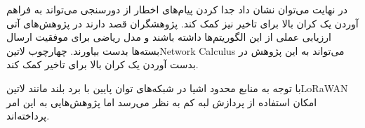 در نهایت می‌توان نشان داد جدا کردن پیام‌های اخطار از دورسنجی می‌تواند به فراهم آوردن یک کران بالا برای تاخیر نیز کمک کند. پژوهشگران قصد دارند در پژوهش‌های آتی ارزیابی عملی از این الگوریتم‌ها داشته باشند
و مدل ریاضی برای موفقیت ارسال بسته‌ها بدست بیاورند. چهارچوب ‌لاتین{Network Calculus} می‌تواند به این پژوهش در بدست آوردن یک کران بالا برای تاخیر کمک کند.




با توجه به منابع محدود اشیا در شبکه‌های توان پایین با برد بلند مانند ‌لاتین{LoRaWAN} امکان استفاده از پردازش لبه کم به نظر می‌رسد اما پژوهش‌هایی به این امر پرداخته‌اند.
